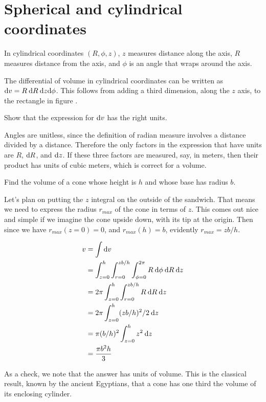 \section{Spherical and cylindrical coordinates}

In cylindrical coordinates $(R,\phi,z)$,
$z$ measures distance
along the axis, $R$ measures distance from the axis, and $\phi$
is an angle that wraps around the axis.
%

The differential of volume in cylindrical coordinates can be
written as $\textup{d} v = R \: \textup{d} R \: \textup{d} z \textup{d} \phi$. This follows from adding a third dimension,
along the $z$ axis, to the rectangle in figure .

\begin{eg}
\egquestion Show that the expression for $\textup{d} v$ has the right units.

\eganswer Angles are unitless, since the definition of radian measure involves a distance
divided by a distance. Therefore the only factors in the expression that have units
are $R$, $\textup{d} R$, and $\textup{d} z$. If these three factors are measured, say, in meters, then
their product has units of cubic meters, which is correct for a volume.
\end{eg}

\begin{eg}
\egquestion Find the volume of a cone whose height is $h$ and whose base has radius $b$.

\eganswer Let's plan on putting the $z$ integral on the outside of the sandwich. That means
we need to express the radius $r_{max}$ of the cone in terms of $z$. This comes out nice and
simple if we imagine the cone upside down, with its tip at the origin.
Then since we have $r_{max}(z=0)=0$, and $r_{max}(h)=b$, evidently $r_{max}=zb/h$.

\begin{align*}
  v &= \int \textup{d} v \\
    &= \int_{z=0}^h \int_{r=0}^{zb/h} \int_{\phi=0}^{2\pi} R \: \textup{d}\phi \:\textup{d} R \: \textup{d} z \\
    &= 2\pi \int_{z=0}^h \int_{r=0}^{zb/h} R \:\textup{d} R \: \textup{d} z \\
    &= 2\pi \int_{z=0}^h (zb/h)^2/2 \: \textup{d} z \\
    &= \pi (b/h)^2 \int_{z=0}^h z^2 \: \textup{d} z \\
    &= \frac{\pi b^2 h}{3}
\end{align*}

As a check, we note that the answer has units of volume. This is the classical result, known
by the ancient Egyptians, that a cone has one third the volume of its enclosing cylinder.
\end{eg}

